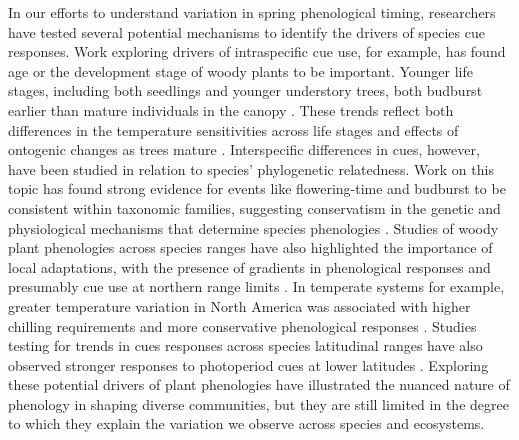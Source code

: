 \documentclass{article}\usepackage[]{graphicx}\usepackage[]{color}
\begin{document}
In our efforts to understand variation in spring phenological timing, researchers have tested several potential mechanisms to identify the drivers of species cue responses. Work exploring drivers of intraspecific cue use, for example, has found age or the development stage of woody plants to be important. Younger life stages, including both seedlings and younger understory trees, both budburst earlier than mature individuals in the canopy \citep{Vitasse2013,Seiwa1991}. These trends reflect both differences in the temperature sensitivities across life stages and effects of ontogenic changes as trees mature \citep{Vitasse2013,Seiwa1991}. Interspecific differences in cues, however, have been studied in relation to species' phylogenetic relatedness. Work on this topic has found strong evidence for events like flowering-time and budburst to be consistent within taxonomic families, suggesting conservatism in the genetic and physiological mechanisms that determine species phenologies \citep{Kochmer1986,Davies2013,Gougherty2018}. Studies of woody plant phenologies across species ranges have also highlighted the importance of local adaptations, with the presence of gradients in phenological responses and presumably cue use at northern range limits \citep{Lechowicz1984,Chuine2001,Chuine2010}. In temperate systems for example, greater temperature variation in North America was associated with higher chilling requirements and more conservative phenological responses \citep{Zohner2017}.  Studies testing for trends in cues responses across species latitudinal ranges have also observed stronger responses to photoperiod cues at lower latitudes \citep{Zohner2016}. Exploring these potential drivers of plant phenologies have illustrated the nuanced nature of phenology in shaping diverse communities, but they are still limited in the degree to which they explain the variation we observe across species and ecosystems.\\
\end{document}
